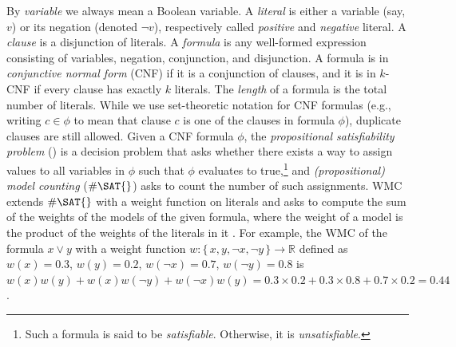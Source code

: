 \documentclass{article}
\theoremstyle{definition}
\theoremstyle{remark}
\begin{document}
By \emph{variable} we always mean a Boolean variable. A \emph{literal} is either
a variable (say, $v$) or its negation (denoted $\neg v$), respectively called
\emph{positive} and \emph{negative} literal. A \emph{clause} is a disjunction of
literals. A \emph{formula} is any well-formed expression consisting of
variables, negation, conjunction, and disjunction. A formula is in
\emph{conjunctive normal form} (CNF) if it is a conjunction of clauses, and it
is in $k$-CNF if every clause has exactly $k$ literals. The \emph{length} of a
formula is the total number of literals. While we use set-theoretic notation for
CNF formulas (e.g., writing $c \in \phi$ to mean that clause $c$ is one of the
clauses in formula $\phi$), duplicate clauses are still allowed. Given a CNF
formula $\phi$, the \emph{propositional satisfiability problem} (\SAT{}) is a
decision problem that asks whether there exists a way to assign values to all
variables in $\phi$ such that $\phi$ evaluates to true,\footnote{Such a formula
  is said to be \emph{satisfiable}. Otherwise, it is \emph{unsatisfiable}.} and
\emph{(propositional) model counting} ($\#\SAT{}$) asks to count the number of
such assignments. \textsf{WMC} extends $\#\SAT{}$ with a weight function on
literals and asks to compute the sum of the weights of the models of the given
formula, where the weight of a model is the product of the weights of the
literals in it \cite{DBLP:journals/ai/ChaviraD08}. For example, the \textsf{WMC}
of the formula $x \lor y$ with a weight function $w\colon \{\,x, y, \neg x, \neg
y\,\} \to \mathbb{R}$ defined as $w(x) = 0.3$, $w(y) = 0.2$, $w(\neg x) = 0.7$,
$w(\neg y) = 0.8$ is $w(x)w(y)+w(x)w(\neg y)+w(\neg x)w(y) = 0.3 \times 0.2 +
0.3 \times 0.8 + 0.7 \times 0.2 = 0.44$.
\end{document}
